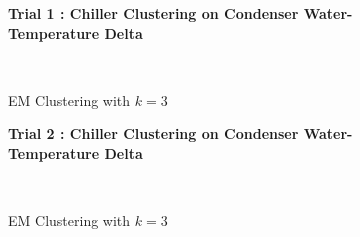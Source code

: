 \begin{figure}[!h]
\centerline{\bfseries\Large Trial 1 : Chiller Clustering on Condenser Water-Temperature Delta}\\
\caption{EM Clustering with $k=3$}
\end{figure}
\begin{figure}[!h]
\centerline{\bfseries\Large Trial 2 : Chiller Clustering on Condenser Water-Temperature Delta}\\
\caption{EM Clustering with $k=3$}
\end{figure}
